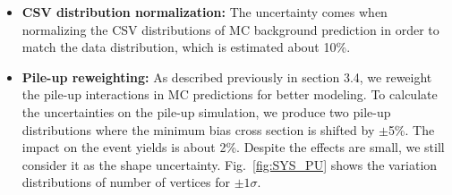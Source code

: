 \begin{itemize}
\item \textbf{CSV distribution normalization:} The uncertainty comes when normalizing the CSV distributions of MC background prediction in order to match the data distribution, which is estimated about 10\%.
\item \textbf{Pile-up reweighting:} As described previously in section 3.4, we reweight the pile-up interactions in MC predictions for better modeling. To calculate the uncertainties on the pile-up simulation, we produce two pile-up distributions where the minimum bias cross section is shifted by $\pm$5\%\cite{PileupError}. The impact on the event yields is about 2\%. Despite the effects are small, we still consider it as the shape uncertainty. Fig.~\ref{fig:SYS_PU} shows the variation distributions of number of vertices for $\pm1\sigma$.  
\end{itemize}

